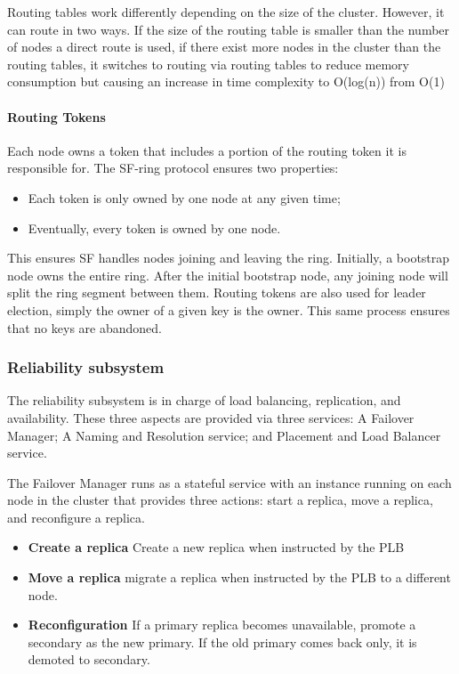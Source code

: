\documentclass[a4paper,10pt,titlepage]{report}
\begin{document}
    Routing tables work differently depending on the size of the cluster. However, it can route in two ways. If the size of the routing table is smaller than the number of nodes a direct route is used, if there exist more nodes in the cluster than the routing tables, it switches to routing via routing tables to reduce memory consumption but causing an increase in time complexity to O(log(n)) from O(1)\\
    \vspace{5mm}
    \paragraph{Routing Tokens}
    
    Each node owns a token that includes a portion of the routing token it is responsible for. The SF-ring protocol ensures two properties:
    \begin{itemize}
        \item Each token is only owned by one node at any given time;
        \item Eventually, every token is owned by one node.
    \end{itemize}
    This ensures SF handles nodes joining and leaving the ring. Initially, a bootstrap node owns the entire ring. After the initial bootstrap node, any joining node will split the ring segment between them. Routing tokens are also used for leader election, simply the owner of a given key is the owner. This same process ensures that no keys are abandoned.

    \subsubsection{Reliability subsystem}
    The reliability subsystem is in charge of load balancing, replication, and availability. These three aspects are provided via three services: A Failover Manager; A Naming and Resolution service; and Placement and Load Balancer service.\\
    \vspace{5mm}

    The Failover Manager runs as a stateful service with an instance running on each node in the cluster that provides three actions: start a replica, move a replica, and reconfigure a replica.\\
    \vspace{5mm}

    \begin{itemize}
        \item \textbf{Create a replica} Create a new replica when instructed by the PLB
        \item \textbf{Move a replica} migrate a replica when instructed by the PLB to a different node.
        \item \textbf{Reconfiguration} If a primary replica becomes unavailable, promote a secondary as the new primary. If the old primary comes back only, it is demoted to secondary.
    \end{itemize}
\end{document}
